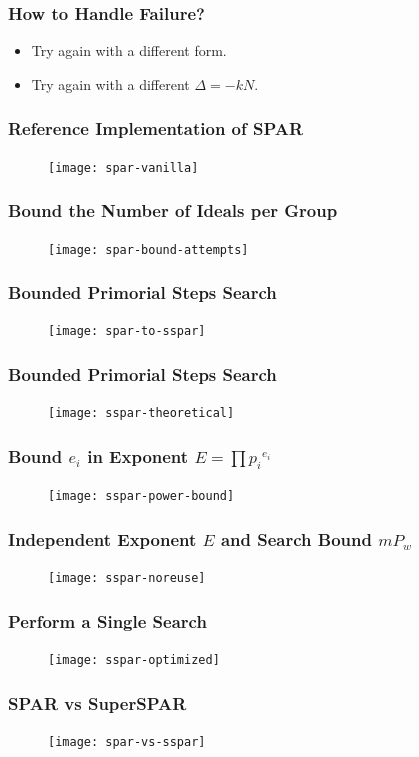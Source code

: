 \documentclass{beamer}
\begin{document}
\begin{frame}
\frametitle{How to Handle Failure?}
\begin{itemize}
\item Try again with a different form.
\item Try again with a different $\Delta = -kN$.
\end{itemize}
\end{frame}


\begin{frame}
\frametitle{Reference Implementation of SPAR}
\begin{figure}
\texttt{[image: spar-vanilla]}
\end{figure}
\end{frame}
\begin{frame}
\frametitle{Bound the Number of Ideals per Group}
\begin{figure}
\texttt{[image: spar-bound-attempts]}
\end{figure}
\end{frame}
\begin{frame}
\frametitle{Bounded Primorial Steps Search}
\begin{figure}
\texttt{[image: spar-to-sspar]}
\end{figure}
\end{frame}
\begin{frame}
\frametitle{Bounded Primorial Steps Search}
\begin{figure}
\texttt{[image: sspar-theoretical]}
\end{figure}
\end{frame}
\begin{frame}
\frametitle{Bound $e_i$ in Exponent $E = \prod {p_i}^{e_i}$}
\begin{figure}
\texttt{[image: sspar-power-bound]}
\end{figure}
\end{frame}
\begin{frame}
\frametitle{Independent Exponent $E$ and Search Bound $mP_w$}
\begin{figure}
\texttt{[image: sspar-noreuse]}
\end{figure}
\end{frame}
\begin{frame}
\frametitle{Perform a Single Search}
\begin{figure}
\texttt{[image: sspar-optimized]}
\end{figure}
\end{frame}
\begin{frame}
\frametitle{SPAR vs SuperSPAR}
\begin{figure}
\texttt{[image: spar-vs-sspar]}
\end{figure}
\end{frame}
\end{document}
